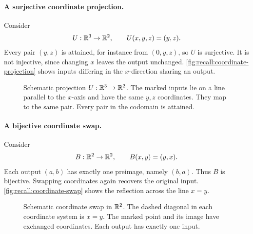 \paragraph{A surjective coordinate projection.}
Consider
\[
  U:\mathbb{R}^3\to\mathbb{R}^2,\qquad U(x,y,z)=(y,z).
\]
Every pair \((y,z)\) is attained, for instance from \((0,y,z)\), so
\(U\) is surjective. It is not injective, since changing \(x\) leaves
the output unchanged. \autoref{fig:recall:coordinate-projection}
shows inputs differing in the \(x\)-direction sharing an output.

\begin{figure}[htbp]
  \centering
  
  \caption[Projection onto two coordinates]{Schematic projection \(U:\mathbb{R}^3\to\mathbb{R}^2\). The marked inputs
    lie on a line parallel to the \(x\)-axis and have the same \(y,z\)
    coordinates. They map to the same pair. Every pair in the codomain
    is attained.}
  \label{fig:recall:coordinate-projection}
\end{figure}

\paragraph{A bijective coordinate swap.}
Consider
\[
  B:\mathbb{R}^2\to\mathbb{R}^2,\qquad B(x,y)=(y,x).
\]
Each output \((a,b)\) has exactly one preimage, namely \((b,a)\).
Thus \(B\) is bijective. Swapping coordinates again recovers the
original input. \autoref{fig:recall:coordinate-swap} shows the
reflection across the line \(x=y\).

\begin{figure}[htbp]
  \centering
  
  \caption[Swapping two coordinates]{Schematic coordinate swap in \(\mathbb{R}^2\). The dashed diagonal
    in each coordinate system is \(x=y\). The marked point and its
    image have exchanged coordinates. Each output has exactly one input.}
  \label{fig:recall:coordinate-swap}
\end{figure}
